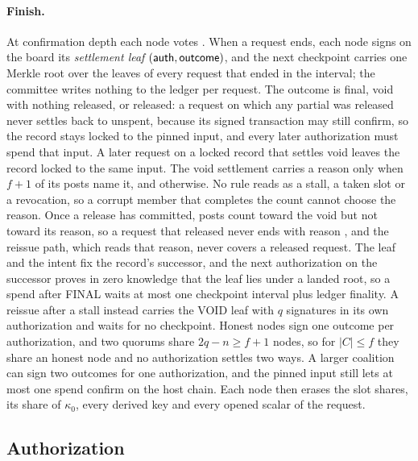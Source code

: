 \paragraph{Finish.} At confirmation depth each node votes . When a request ends, each node signs on the board its \emph{settlement leaf} $(\mathsf{auth}, \mathsf{outcome})$, and the next checkpoint carries one Merkle root over the leaves of every request that ended in the interval; the committee writes nothing to the ledger per request. The outcome is final, void with nothing released, or released: a request on which any partial was released never settles back to unspent, because its signed transaction may still confirm, so the record stays locked to the pinned input, and every later authorization must spend that input. A later request on a locked record that settles void leaves the record locked to the same input. The void settlement carries a reason only when $f + 1$ of its posts name it, and  otherwise. No rule reads  as a stall, a taken slot or a revocation, so a corrupt member that completes the count cannot choose the reason. Once a release has committed,  posts count toward the void but not toward its reason, so a request that released never ends with reason , and the reissue path, which reads that reason, never covers a released request. The leaf and the intent fix the record's successor, and the next authorization on the successor proves in zero knowledge that the leaf lies under a landed root, so a spend after FINAL waits at most one checkpoint interval plus ledger finality. A reissue after a stall instead carries the VOID leaf with $q$ signatures in its own authorization and waits for no checkpoint. Honest nodes sign one outcome per authorization, and two quorums share $2q - n \ge f + 1$ nodes, so for $|C| \le f$ they share an honest node and no authorization settles two ways. A larger coalition can sign two outcomes for one authorization, and the pinned input still lets at most one spend confirm on the host chain. Each node then erases the slot shares, its share of $\kappa_0$, every derived key and every opened scalar of the request.

\subsection{Authorization}\label{sec:auth}

